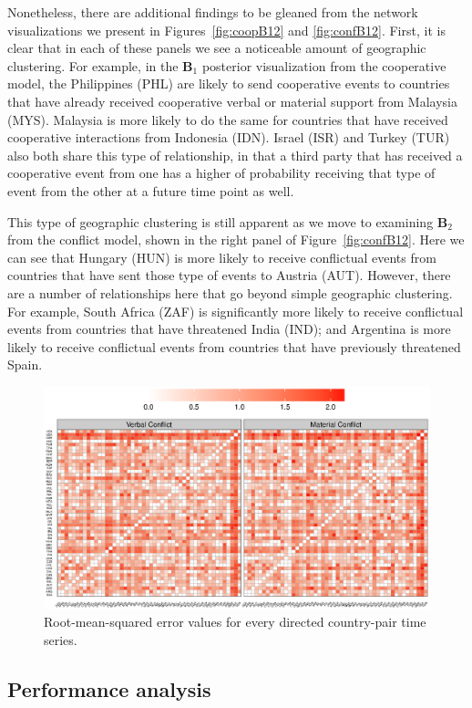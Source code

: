 \documentclass[3p,times,twocolumn,authoryear,12pt]{elsarticle}
\newcommand{\bl}[1]{{\mathbf #1}}
\begin{document}
Nonetheless, there are additional findings to be gleaned from the network visualizations we present in Figures~\ref{fig:coopB12} and \ref{fig:confB12}. First, it is clear that in each of these panels we see a noticeable amount of geographic clustering. For example, in the $\bl B_1$ posterior visualization from the cooperative model, the Philippines (PHL) are likely to send cooperative events to countries that have already received cooperative verbal or material support from Malaysia (MYS). Malaysia is more likely to do the same for countries that have received cooperative interactions from Indonesia (IDN). Israel (ISR) and Turkey (TUR) also both share this type of relationship, in that a third party that has received a cooperative event from one has a higher of probability receiving that type of event from the other at a future time point as well. 

This type of geographic clustering is still apparent as we move to examining $\bl B_2$ from the  conflict model, shown in the right panel of Figure~\ref{fig:confB12}. Here we can see that Hungary (HUN) is more likely to receive conflictual events from countries that have sent those type of events to Austria (AUT). However, there are a number of relationships here that go beyond simple geographic clustering. For example, South Africa (ZAF) is significantly more likely to receive conflictual events from countries that have threatened India (IND); and Argentina is more likely to receive conflictual events from countries that have previously threatened Spain. 

\begin{figure}[!ht]
	\centering
	\includegraphics[width=.8\textwidth]{Conf_iperf}
	\caption{Root-mean-squared error values for every directed country-pair time series.}
	\label{fig:perf}
\end{figure}

\subsection{Performance analysis}
\end{document}
